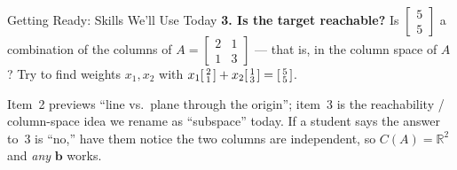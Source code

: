 \documentclass[10pt]{article}
\begin{document}
\begin{notesbox}{Getting Ready: Skills We'll Use Today}
\vspace{4pt}
\textbf{3. Is the target reachable?} Is $\begin{bmatrix} 5 \\ 5 \end{bmatrix}$ a combination of
the columns of $A=\begin{bmatrix} 2 & 1 \\ 1 & 3 \end{bmatrix}$ --- that is, in the column space of
$A$? Try to find weights $x_1,x_2$ with
$x_1\begin{bsmallmatrix} 2\\1 \end{bsmallmatrix}+x_2\begin{bsmallmatrix} 1\\3 \end{bsmallmatrix}=\begin{bsmallmatrix} 5\\5 \end{bsmallmatrix}$.
\end{notesbox}

\begin{teachernote}
Item~2 previews ``line vs.\ plane through the origin''; item~3 is the reachability / column-space
idea we rename as ``subspace'' today. If a student says the answer to~3 is ``no,'' have them notice
the two columns are independent, so $C(A)=\mathbb{R}^2$ and \emph{any} $\mathbf b$ works.
\end{teachernote}
\end{document}
